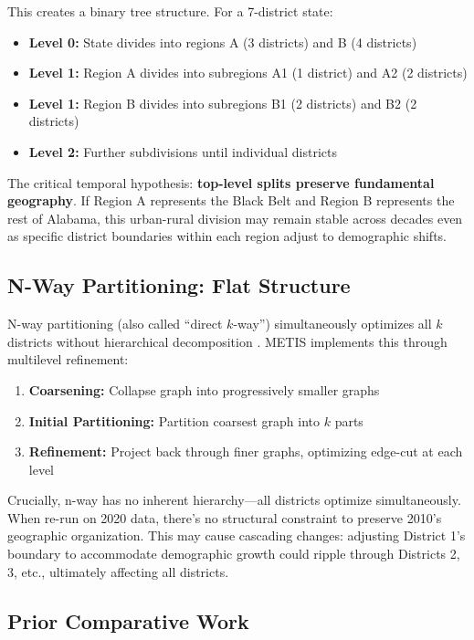 This creates a binary tree structure. For a 7-district state:
\begin{itemize}
    \item \textbf{Level 0:} State divides into regions A (3 districts) and B (4 districts)
    \item \textbf{Level 1:} Region A divides into subregions A1 (1 district) and A2 (2 districts)
    \item \textbf{Level 1:} Region B divides into subregions B1 (2 districts) and B2 (2 districts)
    \item \textbf{Level 2:} Further subdivisions until individual districts
\end{itemize}

The critical temporal hypothesis: \textbf{top-level splits preserve fundamental geography}. If Region A represents the Black Belt and Region B represents the rest of Alabama, this urban-rural division may remain stable across decades even as specific district boundaries within each region adjust to demographic shifts.

\subsection{N-Way Partitioning: Flat Structure}

N-way partitioning (also called ``direct $k$-way'') simultaneously optimizes all $k$ districts without hierarchical decomposition \citep{karypis1998fast}. METIS implements this through multilevel refinement:

\begin{enumerate}
    \item \textbf{Coarsening:} Collapse graph into progressively smaller graphs
    \item \textbf{Initial Partitioning:} Partition coarsest graph into $k$ parts
    \item \textbf{Refinement:} Project back through finer graphs, optimizing edge-cut at each level
\end{enumerate}

Crucially, n-way has no inherent hierarchy—all districts optimize simultaneously. When re-run on 2020 data, there's no structural constraint to preserve 2010's geographic organization. This may cause cascading changes: adjusting District 1's boundary to accommodate demographic growth could ripple through Districts 2, 3, etc., ultimately affecting all districts.

\subsection{Prior Comparative Work}

